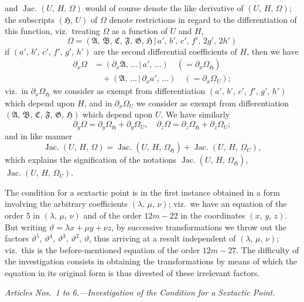 \documentclass[11pt,a4paper]{article}
\providecommand{\mid}{\,|\,}
\providecommand{\Jac}{\operatorname{Jac.}}
\begin{document}
and $\Jac(U,\,H,\,\Omega)$ would of course denote the like derivative of $(U,\,H,\,\Omega)$; the subscripts $(\mathfrak{H},\,U)$ of $\Omega$ denote restrictions in regard to the differentiation of this function, viz.\ treating $\Omega$ as a function of $U$ and $H$,
\[
\Omega = (\mathfrak{A},\,\mathfrak{B},\,\mathfrak{C},\,\mathfrak{F},\,\mathfrak{G},\,\mathfrak{H}\mid a',\,b',\,c',\,f',\,2g',\,2h')
\]
if $(a',\,b',\,c',\,f',\,g',\,h')$ are the second differential coefficients of $H$, then we have
\[
\begin{aligned}
\partial_{x}\Omega &= (\partial_{x}\mathfrak{A},\,\ldots\mid a',\,\ldots) \quad (= \partial_{x}\Omega_{\mathfrak{H}})\\
&\quad + (\mathfrak{A},\,\ldots\mid \partial_{x}a',\,\ldots) \quad (= \partial_{x}\Omega_{U});
\end{aligned}
\]
viz.\ in $\partial_{x}\Omega_{\mathfrak{H}}$ we consider as exempt from differentiation $(a',\,b',\,c',\,f',\,g',\,h')$ which depend upon $H$, and in $\partial_{x}\Omega_{U}$ we consider as exempt from differentiation $(\mathfrak{A},\,\mathfrak{B},\,\mathfrak{C},\,\mathfrak{F},\,\mathfrak{G},\,\mathfrak{H})$ which depend upon $U$. We have similarly
\[
\partial_{y}\Omega = \partial_{y}\Omega_{\mathfrak{H}} + \partial_{y}\Omega_{U},\quad \partial_{z}\Omega = \partial_{z}\Omega_{\mathfrak{H}} + \partial_{z}\Omega_{U};
\]
and in like manner
\[
\Jac(U,\,H,\,\Omega) = \Jac(U,\,H,\,\Omega_{\mathfrak{H}}) + \Jac(U,\,H,\,\Omega_{U}),
\]
which explains the signification of the notations $\Jac(U,\,H,\,\Omega_{\mathfrak{H}})$, $\Jac(U,\,H,\,\Omega_{U})$.

\medskip

The condition for a sextactic point is in the first instance obtained in a form involving the arbitrary coefficients $(\lambda,\,\mu,\,\nu)$; viz.\ we have an equation of the order $5$ in $(\lambda,\,\mu,\,\nu)$ and of the order $12m - 22$ in the coordinates $(x,\,y,\,z)$. But writing $\vartheta = \lambda x + \mu y + \nu z$, by successive transformations we throw out the factors $\vartheta^{5},\,\vartheta^{4},\,\vartheta^{3},\,\vartheta^{2},\,\vartheta$, thus arriving at a result independent of $(\lambda,\,\mu,\,\nu)$; viz.\ this is the before-mentioned equation of the order $12m - 27$. The difficulty of the investigation consists in obtaining the transformations by means of which the equation in its original form is thus divested of these irrelevant factors.

\bigskip

\begin{center}
\textit{Articles Nos.\ 1 to 6.---Investigation of the Condition for a Sextactic Point.}
\end{center}
\end{document}
